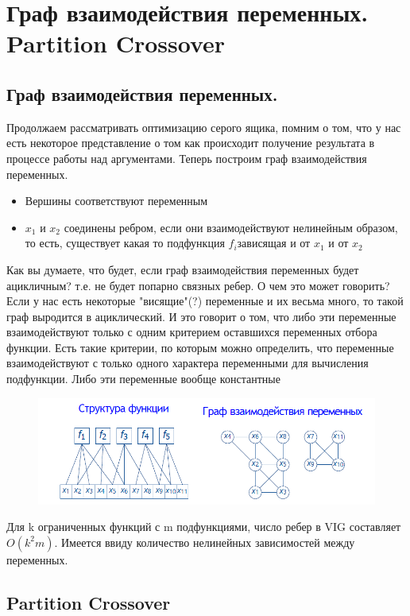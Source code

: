 \section{Граф взаимодействия переменных. Partition Crossover}
\subsection{Граф взаимодействия переменных.}
Продолжаем рассматривать оптимизацию серого ящика, помним о том, что у нас есть некоторое представление о том как происходит получение результата в процессе работы над аргументами. Теперь построим граф взаимодействия переменных.
\begin{itemize}
    \item Вершины соответствуют переменным
    \item $x_1$ и $x_2$ соединены ребром, если они взаимодействуют нелинейным образом, то есть, существует какая то подфункция $f_i $зависящая и от $x_1$ и от $x_2$
\end{itemize}
Как вы думаете, что будет, если граф взаимодействия переменных будет ацикличным? т.е. не будет попарно связных ребер. О чем это может говорить?\\
Если у нас есть некоторые "висящие"(?) переменные и их весьма много, то такой граф выродится в ациклический. И это говорит о том, что либо эти переменные взаимодействуют только с одним критерием оставшихся переменных отбора функции. Есть такие критерии, по которым можно определить, что переменные взаимодействуют с только одного характера переменными для вычисления подфункции. Либо эти переменные вообще константные\\
\begin{figure}[H]
\centering
\includegraphics[width=0.8\linewidth]{images/graf.PNG}
\end{figure}
Для k ограниченных функций с m подфункциями, число ребер в VIG составляет $O(k^2m)$. Имеется ввиду количество нелинейных зависимостей между переменных.
\subsection{Partition Crossover}

